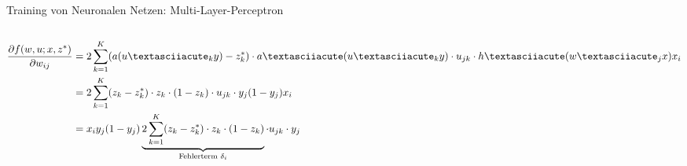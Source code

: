 \documentclass[aspectratio=1610, xcolor=dvipsnames, 9pt]{beamer}
\begin{document}
\begin{frame}{Training von Neuronalen Netzen: Multi-Layer-Perceptron}
\begin{columns}
\begin{column}{1\textwidth}
\begin{itemize}
\begin{align*}
               \frac{\partial f(w,u; x,z^*)}{\partial w_{ij}} &= 2 \sum_{k=1} ^K (a(u´_k y) -z^*_k) \cdot a´(u´_k y) \cdot u_{jk} \cdot h´(w´_j x) x_i \\
                                                             &= 2 \sum_{k=1} ^K ( z_k -z^*_k) \cdot z_k \cdot (1-z_k) \cdot u_{jk} \cdot y_j (1-y_j) x_i \\                                                            
                                                             &= x_i y_j (1-y_j)  \underbrace{2 \sum_{k=1} ^K ( z_k -z^*_k) \cdot z_k \cdot (1-z_k) }_\text{Fehlerterm $ \delta_i$} \cdot u_{jk} \cdot y_j 
            \end{align*}
            \end{itemize}
          \end{column}
        \end{columns}
      \end{frame}
\end{document}
